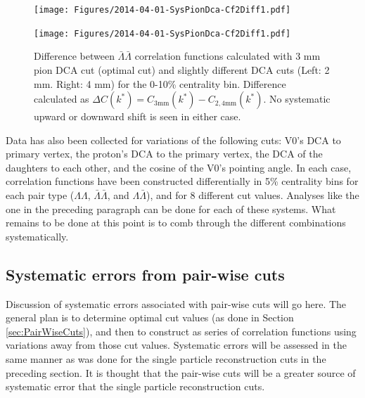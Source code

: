 \begin{figure}[h]
\begin{minipage}{18pc}

\texttt{[image: Figures/2014-04-01-SysPionDca-Cf2Diff1.pdf]}
\end{minipage}\hspace{2pc}
\begin{minipage}{18pc}
\texttt{[image: Figures/2014-04-01-SysPionDca-Cf2Diff1.pdf]}
\end{minipage} 
\caption[$\Delta C(k^*)$ for $\bar{\Lambda}\bar{\Lambda}$ correlation functions with different pion DCA cuts]{Difference between $\bar{\Lambda}\bar{\Lambda}$ correlation functions calculated with 3 mm pion DCA cut (optimal cut) and slightly different DCA cuts (Left: 2 mm.  Right: 4 mm) for the 0-10\% centrality bin.  Difference calculated as $\Delta C(k^*) = C_{3 \mathrm{mm}}(k^*)-C_{2,4 \mathrm{mm}}(k^*)$.  No systematic upward or downward shift is seen in either case.}
\label{fig:SysPionDcaCf2Diff13}
\end{figure}

Data has also been collected for variations of the following cuts: V0's DCA to primary vertex, the proton's DCA to the primary vertex, the DCA of the daughters to each other, and the cosine of the V0's pointing angle.  In each case, correlation functions have been constructed differentially in 5\% centrality bins for each pair type ($\Lambda\Lambda$, $\bar{\Lambda}\bar{\Lambda}$, and $\Lambda\bar{\Lambda}$), and for 8 different cut values.  Analyses like the one in the preceding paragraph can be done for each of these systems.  What remains to be done at this point is to comb through the different combinations systematically.



\subsection{Systematic errors from pair-wise cuts}
\label{sec:SystematicsPairWise}

Discussion of systematic errors associated with pair-wise cuts will go here.  The general plan is to determine optimal cut values (as done in Section \ref{sec:PairWiseCuts}), and then to construct as series of correlation functions using variations away from those cut values.  Systematic errors will be assessed in the same manner as was done for the single particle reconstruction cuts in the preceding section.  It is thought that the pair-wise cuts will be a greater source of systematic error that the single particle reconstruction cuts.

